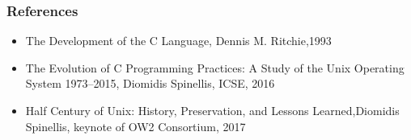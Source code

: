 \begin{frame}[plain]
	\frametitle{References}
	
	\begin{itemize}
		\item The Development of the C Language, Dennis M. Ritchie,1993

		\item The Evolution of C Programming Practices:
		A Study of the Unix Operating System 1973–2015, Diomidis Spinellis,
		ICSE, 2016
		
		\item Half Century of Unix:
		History, Preservation, and
		Lessons Learned,Diomidis Spinellis, keynote of OW2 Consortium, 2017
		
	\end{itemize}
	
	
\end{frame}
